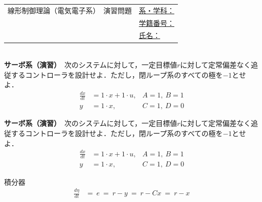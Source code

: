 \documentclass[a4paper,11pt]{jreport}
\begin{document}
\newpage
\begin{tabular}{cl}
\hspace*{2cm}
{\large 線形制御理論（電気電子系）　演習問題}
\hspace{1cm}
&
\underline{系・学科：\hspace{3cm}}
\\[2mm]
&\underline{学籍番号：\hspace{3cm}}
\\[2mm]
&\underline{氏名：\hspace{5cm}}
\end{tabular}
\ \\

\noindent
{\bf サーボ系（演習）}　次のシステムに対して，一定目標値$r$に対して定常偏差なく追従するコントローラを設計せよ．ただし，閉ループ系のすべての極を$-1$とせよ．
\begin{align*}
	\frac{dx}{dt} &= 1 \cdot x + 1 \cdot u, \hspace{0cm} &A=1,\  B=1
\\
	y &= 1 \cdot x , &C=1, \ D=0
\end{align*}


\newpage
\noindent
{\bf サーボ系（演習）}　次のシステムに対して，一定目標値$r$に対して定常偏差なく追従するコントローラを設計せよ．ただし，閉ループ系のすべての極を$-1$とせよ．
\begin{align*}
	\frac{dx}{dt} &= 1 \cdot x + 1 \cdot u, \hspace{0cm} &A=1,\  B=1
\\
	y &= 1 \cdot x , &C=1, \ D=0
\end{align*}

積分器
\begin{align*}
	\frac{d \eta}{dt}&= \ e \ = \ r-y \ = \ r-Cx \ = \ r-x
\end{align*}
\end{document}
